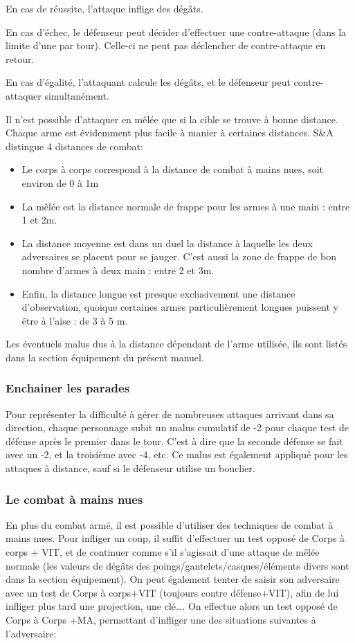 \documentclass[10pt,a4paper,twocolumn]{book}
\begin{document}
    En cas de réussite, l’attaque inflige des dégâts.
    
    En cas d’échec, le défenseur peut décider d’effectuer une contre-attaque (dans la limite d’une par tour). Celle-ci ne peut pas déclencher de contre-attaque en retour.
    
    En cas d’égalité, l’attaquant calcule les dégâts, et le défenseur peut contre-attaquer simultanément.
    
    Il n’est possible d’attaquer en mêlée que si la cible se trouve à bonne distance. Chaque arme est évidemment plus facile à manier à certaines distances. S\&A distingue 4 distances de combat:
    \begin{itemize}
    \item{}Le corps à corps correspond à la distance de combat à mains nues, soit environ de 0 à 1m
\item{}La mêlée est la distance normale de frappe pour les armes à une main : entre 1 et 2m.
\item{}La distance moyenne est dans un duel la distance à laquelle les deux adversaires se placent pour se jauger. C’est aussi la zone de frappe de bon nombre d’armes à deux main : entre 2 et 3m.
\item{}Enfin, la distance longue est presque exclusivement une distance d’observation, quoique certaines armes particulièrement longues puissent y être à l’aise : de 3 à 5 m.
    \end{itemize}

Les éventuels malus dus à la distance dépendant de l’arme utilisée, ils sont listés dans la section équipement du présent manuel.
\subsubsection{Enchainer les parades}
Pour représenter la difficulté à gérer de nombreuses attaques arrivant dans sa direction, chaque personnage subit un malus cumulatif de -2 pour chaque test de défense après le premier dans le tour. C’est à dire que la seconde défense se fait avec un -2, et la troisième avec -4, etc. Ce malus est également appliqué pour les attaques à distance, sauf si le défenseur utilise un bouclier.
\subsubsection{Le combat à mains nues}
En plus du combat armé, il est possible d’utiliser des techniques de combat à mains nues.
Pour infliger un coup, il suffit d’effectuer un test opposé de Corps à corps + VIT, et de continuer comme s’il s’agissait d’une attaque de mêlée normale (les valeurs de dégâts des poings/gantelets/casques/éléments divers sont dans la section équipement).
On peut également tenter de saisir son adversaire avec un test de Corps à corps+VIT (toujours contre défense+VIT), afin de lui infliger plus tard une projection, une clé….
On effectue alors un test opposé de Corps à Corps +MA, permettant d’infliger une des situations suivantes à l’adversaire:
\end{document}

